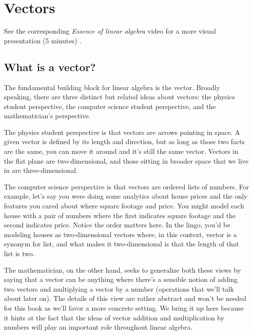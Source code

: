 \section{Vectors}

\begin{remark}
  See the corresponding \textit{Essence of linear algebra} video for a more
  visual presentation (5 minutes) \cite{bib:linalg_vectors}.
\end{remark}

\subsection{What is a vector?}

The fundamental building block for linear algebra is the vector. Broadly
speaking, there are three distinct but related ideas about vectors: the physics
student perspective, the computer science student perspective, and the
mathematician's perspective.

The physics student perspective is that vectors are arrows pointing in space. A
given vector is defined by its length and direction, but as long as those two
facts are the same, you can move it around and it's still the same vector.
Vectors in the flat plane are two-dimensional, and those sitting in broader
space that we live in are three-dimensional.

The computer science perspective is that vectors are ordered lists of numbers.
For example, let's say you were doing some analytics about house prices and the
only features you cared about where square footage and price. You might model
each house with a pair of numbers where the first indicates square footage and
the second indicates price. Notice the order matters here. In the lingo, you'd
be modeling houses as two-dimensional vectors where, in this context, vector is
a synonym for list, and what makes it two-dimensional is that the length of that
list is two.

The mathematician, on the other hand, seeks to generalize both these views by
saying that a vector can be anything where there's a sensible notion of adding
two vectors and multiplying a vector by a number (operations that we'll talk
about later on). The details of this view are rather abstract and won't be
needed for this book as we'll favor a more concrete setting. We bring it up here
because it hints at the fact that the ideas of vector addition and
multiplication by numbers will play an important role throughout linear algebra.

